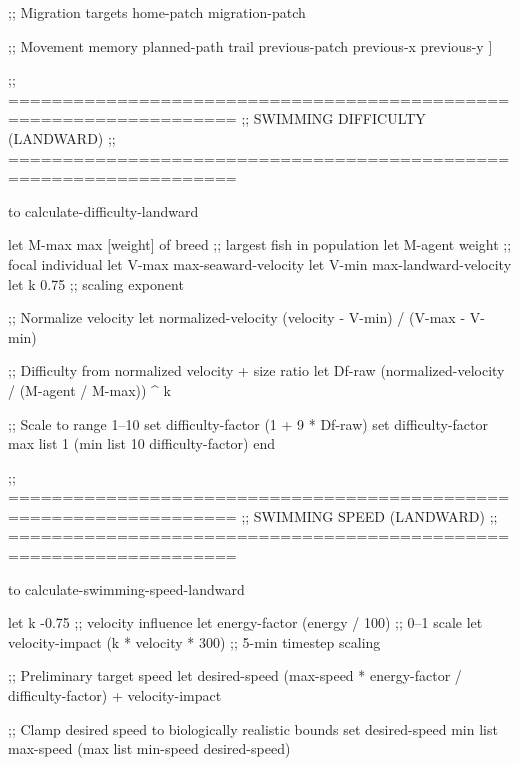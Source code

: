 \documentclass[
]{book}
\newenvironment{Shaded}{\begin{snugshade}}{\end{snugshade}}
\newcommand{\NormalTok}[1]{#1}
\begin{document}
\begin{Shaded}
\begin{Highlighting}[]
\NormalTok{  ;; Migration targets}
\NormalTok{  home{-}patch}
\NormalTok{  migration{-}patch}

\NormalTok{  ;; Movement memory}
\NormalTok{  planned{-}path}
\NormalTok{  trail}
\NormalTok{  previous{-}patch}
\NormalTok{  previous{-}x}
\NormalTok{  previous{-}y}
\NormalTok{]}


\NormalTok{;; ===================================================================}
\NormalTok{;;  SWIMMING DIFFICULTY (LANDWARD)}
\NormalTok{;; ===================================================================}

\NormalTok{to calculate{-}difficulty{-}landward}
  
\NormalTok{  let M{-}max max [weight] of breed      ;; largest fish in population}
\NormalTok{  let M{-}agent weight                   ;; focal individual}
\NormalTok{  let V{-}max max{-}seaward{-}velocity}
\NormalTok{  let V{-}min max{-}landward{-}velocity}
\NormalTok{  let k 0.75                           ;; scaling exponent}

\NormalTok{  ;; Normalize velocity}
\NormalTok{  let normalized{-}velocity (velocity {-} V{-}min) / (V{-}max {-} V{-}min)}

\NormalTok{  ;; Difficulty from normalized velocity + size ratio}
\NormalTok{  let Df{-}raw (normalized{-}velocity / (M{-}agent / M{-}max)) \^{} k}
  
\NormalTok{  ;; Scale to range 1–10}
\NormalTok{  set difficulty{-}factor (1 + 9 * Df{-}raw)}
\NormalTok{  set difficulty{-}factor max list 1 (min list 10 difficulty{-}factor)}
\NormalTok{end}


\NormalTok{;; ===================================================================}
\NormalTok{;;  SWIMMING SPEED (LANDWARD)}
\NormalTok{;; ===================================================================}

\NormalTok{to calculate{-}swimming{-}speed{-}landward}
  
\NormalTok{  let k {-}0.75                                    ;; velocity influence}
\NormalTok{  let energy{-}factor (energy / 100)               ;; 0–1 scale}
\NormalTok{  let velocity{-}impact (k * velocity * 300)       ;; 5{-}min timestep scaling}

\NormalTok{  ;; Preliminary target speed}
\NormalTok{  let desired{-}speed }
\NormalTok{    (max{-}speed * energy{-}factor / difficulty{-}factor)}
\NormalTok{      + velocity{-}impact}

\NormalTok{  ;; Clamp desired speed to biologically realistic bounds}
\NormalTok{  set desired{-}speed min list max{-}speed (max list min{-}speed desired{-}speed)}


\end{Highlighting}
\end{Shaded}
\end{document}
